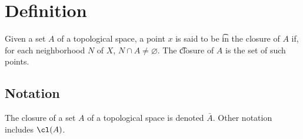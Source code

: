 
\section*{Definition}

Given a set $A$ of a topological space, a point $x$ is said to be \t{in the closure of} $A$ if, for each neighborhood $N$ of $X$, $N \cap  A \neq \varnothing$.
The \t{closure} of $A$ is the set of such points.

\subsection*{Notation}

The closure of a set $A$ of a topological space is denoted $\bar{A}$.
Other notation includes $\cl(A)$.

\blankpage